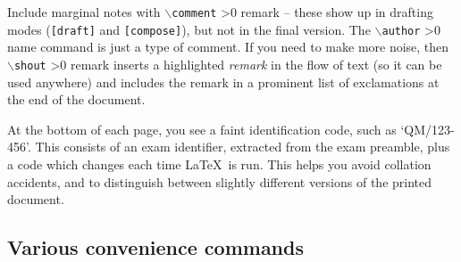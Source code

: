 \documentclass[10pt]{scrartcl}
\makeatletter
\def\csarg#1{\texttt\{\textit{#1}\texttt\}%
  \advance\@tempcnta-1
  \ifnum\@tempcnta>0
    \let\next\csarg
  \else
    \let\next\endgroup          %
  \fi
  \next}
\newcommand\cs[2][0]{\begingroup
  \color{cscolour}%
  $\backslash$\texttt{#2}%
  \@tempcnta=#1
  \ifnum\@tempcnta>0
    \let\next\csarg
  \else
    \let\next\endgroup
  \fi
  \next}
\def\opt#1{\texttt{[#1]}}
\makeatother
\begin{document}
Include marginal notes with \cs[1]{comment}{remark} -- these show up in drafting
modes (\opt{draft} and \opt{compose}), but not in the final version.
The \cs[1]{author}{name} command is just
a type of comment.  If you need to make more noise, then
\cs[1]{shout}{remark} inserts a highlighted \emph{remark} in the flow of text
(so it can be used anywhere) and includes the remark in a prominent
list of exclamations at the end of the document.

At the bottom of each page, you see a faint identification code, such
as `QM/123-456'.  This consists of an exam identifier, extracted from
the exam preamble, plus a code which changes each time \LaTeX\ is
run. This helps you avoid collation accidents, and to distinguish
between slightly different versions of the printed document.

\subsection{Various convenience commands}
\label{s:othercommands}

\makeatletter
\newcommand\BSc{B.Sc.{}}
\newcommand\MSci{M.Sci.{}}
\newcommand\MSc{M.Sc.{}}
\newcommand\MA{M.A.{}}
\newcommand\MEng{M.Eng.{}}
\newcommand\BEng{B.Eng.{}}
%
\newcommand{\dd}{\mathrm{d}}
\newcommand{\ddd}{\,\mathrm{d}}  %
\end{document}
